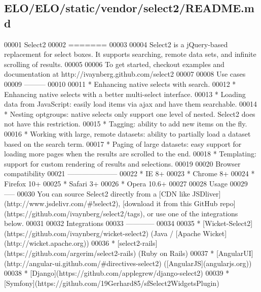 \hypertarget{ELO_2ELO_2static_2vendor_2select2_2README_8md_source}{\subsection{E\-L\-O/\-E\-L\-O/static/vendor/select2/\-R\-E\-A\-D\-M\-E.md}
}

\begin{DoxyCode}
00001 Select2
00002 =======
00003 
00004 Select2 is a jQuery-based replacement \textcolor{keywordflow}{for} select boxes. It supports searching, remote data sets, and 
      infinite scrolling of results.
00005 
00006 To \textcolor{keyword}{get} started, checkout examples and documentation at http:\textcolor{comment}{//ivaynberg.github.com/select2}
00007 
00008 Use cases
00009 ---------
00010 
00011 * Enhancing native selects with search.
00012 * Enhancing native selects with a better multi-select interface.
00013 * Loading data from JavaScript: easily load items via ajax and have them searchable.
00014 * Nesting optgroups: native selects only support one level of nested. Select2 does not have \textcolor{keyword}{this} 
      restriction.
00015 * Tagging: ability to add \textcolor{keyword}{new} items on the fly.
00016 * Working with large, remote datasets: ability to partially load a dataset based on the search term.
00017 * Paging of large datasets: easy support \textcolor{keywordflow}{for} loading more pages when the results are scrolled to the end.
00018 * Templating: support \textcolor{keywordflow}{for} custom rendering of results and selections.
00019 
00020 Browser compatibility
00021 ---------------------
00022 * IE 8+
00023 * Chrome 8+
00024 * Firefox 10+
00025 * Safari 3+
00026 * Opera 10.6+
00027  
00028 Usage
00029 -----
00030 You can source Select2 directly from a [CDN like JSDliver](http:\textcolor{comment}{//www.jsdelivr.com/#!select2), [download it
       from this GitHub repo](https://github.com/ivaynberg/select2/tags), or use one of the integrations below.}
00031 
00032 Integrations
00033 ------------
00034 
00035 * [Wicket-Select2](https:\textcolor{comment}{//github.com/ivaynberg/wicket-select2) (Java / [Apache
       Wicket](http://wicket.apache.org))}
00036 * [select2-rails](https:\textcolor{comment}{//github.com/argerim/select2-rails) (Ruby on Rails)}
00037 * [AngularUI](http:\textcolor{comment}{//angular-ui.github.com/#directives-select2) ([AngularJS](angularjs.org))}
00038 * [Django](https:\textcolor{comment}{//github.com/applegrew/django-select2)}
00039 * [Symfony](https:\textcolor{comment}{//github.com/19Gerhard85/sfSelect2WidgetsPlugin)}

\end{DoxyCode}
